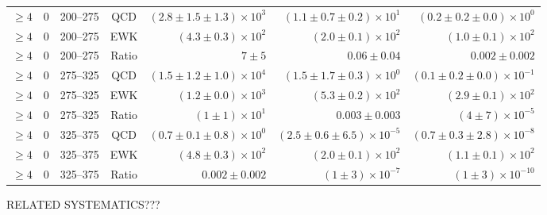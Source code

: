 \begin{table}[h!]
\begin{tabular}{ccccrrr}
$\geq 4$ & 0 & 200--275 & QCD  & $\left(2.8 \pm 1.5 \pm 1.3 \right) \times 10^{3}$ & $\left(1.1 \pm 0.7 \pm 0.2 \right) \times 10^{1}$ & $\left(0.2 \pm 0.2 \pm 0.0 \right) \times 10^{0}$\\
$\geq 4$ & 0 & 200--275 & EWK  & $\left(4.3 \pm 0.3\right) \times 10^{2}$ & $\left(2.0 \pm 0.1\right) \times 10^{2}$ & $\left(1.0 \pm 0.1\right) \times 10^{2}$\\
$\geq 4$ & 0 & 200--275 & Ratio  & $7 \pm 5$ & $0.06 \pm 0.04$ & $0.002 \pm 0.002$\\ [1.0ex]
$\geq 4$ & 0 & 275--325 & QCD  & $\left(1.5 \pm 1.2 \pm 1.0 \right) \times 10^{4}$ & $\left(1.5 \pm 1.7 \pm 0.3 \right) \times 10^{0}$ & $\left(0.1 \pm 0.2 \pm 0.0 \right) \times 10^{-1}$\\
$\geq 4$ & 0 & 275--325 & EWK  & $\left(1.2 \pm 0.0\right) \times 10^{3}$ & $\left(5.3 \pm 0.2\right) \times 10^{2}$ & $\left(2.9 \pm 0.1\right) \times 10^{2}$\\
$\geq 4$ & 0 & 275--325 & Ratio  & $\left(1 \pm 1\right) \times 10^{1}$ & $0.003 \pm 0.003$ & $\left(4 \pm 7\right) \times 10^{-5}$\\ [1.0ex]
$\geq 4$ & 0 & 325--375 & QCD  & $\left(0.7 \pm 0.1 \pm 0.8 \right) \times 10^{0}$ & $\left(2.5 \pm 0.6 \pm 6.5 \right) \times 10^{-5}$ & $\left(0.7 \pm 0.3 \pm 2.8 \right) \times 10^{-8}$\\
$\geq 4$ & 0 & 325--375 & EWK  & $\left(4.8 \pm 0.3\right) \times 10^{2}$ & $\left(2.0 \pm 0.1\right) \times 10^{2}$ & $\left(1.1 \pm 0.1\right) \times 10^{2}$\\
$\geq 4$ & 0 & 325--375 & Ratio  & $0.002 \pm 0.002$ & $\left(1 \pm 3\right) \times 10^{-7}$ & $\left(1 \pm 3\right) \times 10^{-10}$\\ [1.0ex]
\hline
\hline
\end{tabular}
\end{table}

RELATED SYSTEMATICS???

